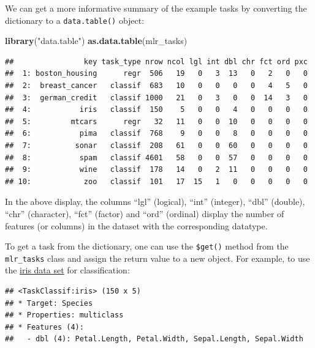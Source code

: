 \documentclass[]{scrbook}
\newenvironment{Shaded}{\begin{snugshade}}{\end{snugshade}}
\newcommand{\KeywordTok}[1]{\textcolor[rgb]{0.13,0.29,0.53}{\textbf{#1}}}
\newcommand{\NormalTok}[1]{#1}
\newcommand{\OperatorTok}[1]{\textcolor[rgb]{0.81,0.36,0.00}{\textbf{#1}}}
\newcommand{\StringTok}[1]{\textcolor[rgb]{0.31,0.60,0.02}{#1}}
\renewenvironment{Shaded} {\begin{snugshade}\small} {\end{snugshade}}
\begin{document}
We can get a more informative summary of the example tasks by converting the dictionary to a \texttt{data.table()} object:

\begin{Shaded}
\begin{Highlighting}[]
\KeywordTok{library}\NormalTok{(}\StringTok{"data.table"}\NormalTok{)}
\KeywordTok{as.data.table}\NormalTok{(mlr_tasks)}
\end{Highlighting}
\end{Shaded}

\begin{verbatim}
##                key task_type nrow ncol lgl int dbl chr fct ord pxc
##  1: boston_housing      regr  506   19   0   3  13   0   2   0   0
##  2:  breast_cancer   classif  683   10   0   0   0   0   4   5   0
##  3:  german_credit   classif 1000   21   0   3   0   0  14   3   0
##  4:           iris   classif  150    5   0   0   4   0   0   0   0
##  5:         mtcars      regr   32   11   0   0  10   0   0   0   0
##  6:           pima   classif  768    9   0   0   8   0   0   0   0
##  7:          sonar   classif  208   61   0   0  60   0   0   0   0
##  8:           spam   classif 4601   58   0   0  57   0   0   0   0
##  9:           wine   classif  178   14   0   2  11   0   0   0   0
## 10:            zoo   classif  101   17  15   1   0   0   0   0   0
\end{verbatim}

In the above display, the columns ``lgl'' (logical), ``int'' (integer), ``dbl'' (double), ``chr'' (character), ``fct'' (factor) and ``ord'' (ordinal) display the number of features (or columns) in the dataset with the corresponding datatype.

To get a task from the dictionary, one can use the \texttt{\$get()} method from the \texttt{mlr\_tasks} class and assign the return value to a new object.
For example, to use the \href{https://en.wikipedia.org/wiki/Iris_flower_data_set}{iris data set} for classification:

\begin{Shaded}
\end{Shaded}

\begin{verbatim}
## <TaskClassif:iris> (150 x 5)
## * Target: Species
## * Properties: multiclass
## * Features (4):
##   - dbl (4): Petal.Length, Petal.Width, Sepal.Length, Sepal.Width
\end{verbatim}
\end{document}
